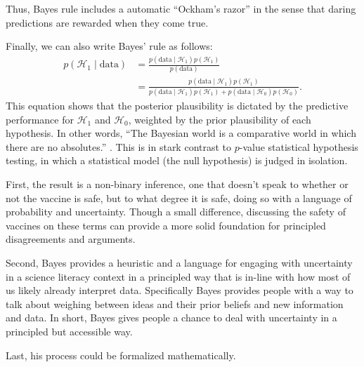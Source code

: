 \documentclass[man]{apa7}
\newcommand{\EJ}[1]{\todo[inline, color=green]{  #1 }}
\begin{document}
Thus, Bayes rule includes a automatic ``Ockham's razor'' \parencite{Jeffreys1939,JefferysBerger1992} in the sense that daring predictions are rewarded when they come true.

Finally, we can also write Bayes' rule as follows:
\begin{equation}
\begin{split}
    p(\mathcal{H}_1 \mid \text{data})& = \frac{p(\text{data} \mid \mathcal{H}_1) p(\mathcal{H}_1)}{p(\text{data})}\\
    & = \frac{p(\text{data} \mid \mathcal{H}_1) p(\mathcal{H}_1)}{p(\text{data} \mid \mathcal{H}_1) p(\mathcal{H}_1) + p(\text{data} \mid \mathcal{H}_0) p(\mathcal{H}_0)}.
\end{split}
\end{equation}
This equation shows that the posterior plausibility is dictated by the predictive performance for $\mathcal{H}_1$ and $\mathcal{H}_0$, weighted by the prior plausibility of each hypothesis. In other words, ``The Bayesian world is a comparative world in which there are no absolutes.'' \parencite[p. 308]{Lindley2000}. This is in stark contrast to $p$-value statistical hypothesis testing, in which a statistical model (the null hypothesis) is judged in isolation. 
\EJ{...and here it ends.}

First, the result is a non-binary inference, one that doesn't speak to whether or not the vaccine is safe, but to what degree it is safe, doing so with a language of probability and uncertainty. Though a small difference, discussing the safety of vaccines on these terms can provide a more solid foundation for principled disagreements and arguments.

Second, Bayes provides a heuristic and a language for engaging with uncertainty in a science literacy context in a principled way that is in-line with how most of us likely already interpret data. Specifically Bayes provides people with a way to talk about weighing between ideas and their prior beliefs and new information and data. In short, Bayes gives people a chance to deal with uncertainty in a principled but accessible way.

Last, his process could be formalized mathematically.

\end{document}
